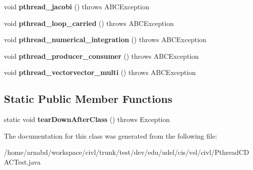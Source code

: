 \begin{DoxyCompactItemize}
\item 
\hypertarget{classedu_1_1udel_1_1cis_1_1vsl_1_1civl_1_1PthreadCDACTest_a5fab149100e7266c450bebee194bd72d}{}void {\bfseries pthread\+\_\+jacobi} ()  throws A\+B\+C\+Exception \label{classedu_1_1udel_1_1cis_1_1vsl_1_1civl_1_1PthreadCDACTest_a5fab149100e7266c450bebee194bd72d}

\item 
\hypertarget{classedu_1_1udel_1_1cis_1_1vsl_1_1civl_1_1PthreadCDACTest_af91a312e9b81e378e850ce436447ee87}{}void {\bfseries pthread\+\_\+loop\+\_\+carried} ()  throws A\+B\+C\+Exception \label{classedu_1_1udel_1_1cis_1_1vsl_1_1civl_1_1PthreadCDACTest_af91a312e9b81e378e850ce436447ee87}

\item 
\hypertarget{classedu_1_1udel_1_1cis_1_1vsl_1_1civl_1_1PthreadCDACTest_aa685c4a5931aa47d63c5556158be3748}{}void {\bfseries pthread\+\_\+numerical\+\_\+integration} ()  throws A\+B\+C\+Exception \label{classedu_1_1udel_1_1cis_1_1vsl_1_1civl_1_1PthreadCDACTest_aa685c4a5931aa47d63c5556158be3748}

\item 
\hypertarget{classedu_1_1udel_1_1cis_1_1vsl_1_1civl_1_1PthreadCDACTest_a1b18d0fbaa6468173c7eb8d40b900973}{}void {\bfseries pthread\+\_\+producer\+\_\+consumer} ()  throws A\+B\+C\+Exception \label{classedu_1_1udel_1_1cis_1_1vsl_1_1civl_1_1PthreadCDACTest_a1b18d0fbaa6468173c7eb8d40b900973}

\item 
\hypertarget{classedu_1_1udel_1_1cis_1_1vsl_1_1civl_1_1PthreadCDACTest_aa73f8aa9fc83e36a5ecee96ec753ed96}{}void {\bfseries pthread\+\_\+vectorvector\+\_\+multi} ()  throws A\+B\+C\+Exception \label{classedu_1_1udel_1_1cis_1_1vsl_1_1civl_1_1PthreadCDACTest_aa73f8aa9fc83e36a5ecee96ec753ed96}

\end{DoxyCompactItemize}
\subsection*{Static Public Member Functions}
\begin{DoxyCompactItemize}
\item 
\hypertarget{classedu_1_1udel_1_1cis_1_1vsl_1_1civl_1_1PthreadCDACTest_a97226c630b2382d8617c33da463e7782}{}static void {\bfseries tear\+Down\+After\+Class} ()  throws Exception \label{classedu_1_1udel_1_1cis_1_1vsl_1_1civl_1_1PthreadCDACTest_a97226c630b2382d8617c33da463e7782}

\end{DoxyCompactItemize}


The documentation for this class was generated from the following file\+:\begin{DoxyCompactItemize}
\item 
/home/arnabd/workspace/civl/trunk/test/dev/edu/udel/cis/vsl/civl/Pthread\+C\+D\+A\+C\+Test.\+java\end{DoxyCompactItemize}
